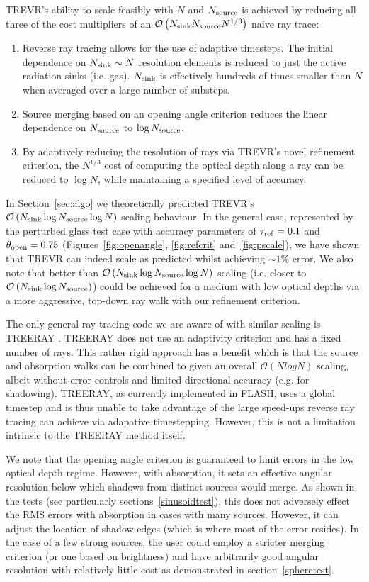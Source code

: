 \documentclass[fleq,usenatbib]{mnras}
\newcommand{\acro}{TREVR}
\newcommand{\bigO}[1]{\mathcal{O}\left(#1\right)}
\newcommand{\NS}{N_{\rm source}}
\newcommand{\NK}{N_{\rm sink}}
\newcommand{\tr}{\tau_{\rm ref}}
\newcommand{\tO}{\theta_{\rm open}}
\begin{document}
{\acro{}'s ability to scale feasibly with $N$ and $\NS$ is achieved by reducing 
all three of the cost multipliers of an $\bigO{\NK \NS N^{1/3}}$ naive ray 
trace:
\begin{enumerate}
\item Reverse ray tracing allows for the use of adaptive timesteps. The 
initial dependence on $\NK \sim N$ resolution elements is reduced to just the 
active radiation sinks (i.e. gas). $\NK$ is effectively hundreds of times smaller than 
$N$ when averaged over a large number of substeps.  
\item Source merging based on an opening angle criterion reduces the linear 
dependence on $\NS$ to $\log\NS$.
\item By adaptively reducing the resolution of rays via \acro{}'s novel 
refinement criterion, the $N^{1/3}$ cost of computing the optical depth along a 
ray can be reduced to $\log N$, while maintaining a specified level of accuracy.  
\end{enumerate}

In Section~\ref{sec:algo} we theoretically predicted \acro{}'s 
$\bigO{\NK \log\NS \log N}$ scaling behaviour. In the general case, 
represented by the perturbed glass test case with accuracy parameters of 
$\tr=0.1$ and $\tO=0.75$ (Figures~\ref{fig:openangle}, \ref{fig:refcrit} 
and~\ref{fig:pscale}), we have shown that \acro{} can indeed scale as 
predicted whilst achieving $\sim 1\%$ error. We also note that better than 
$\bigO{\NK\log\NS\log N}$ scaling (i.e. closer to $\bigO{\NK \log\NS}$) could 
be achieved for a medium with low optical depths via a more aggressive, 
top-down ray walk with our refinement criterion. 

The only general ray-tracing code we are aware of with similar scaling is 
TREERAY \citep{Wunsch2018}. TREERAY does not use an adaptivity criterion and has 
a fixed number of rays. This rather rigid approach has a benefit which is that 
the source and absorption walks can be combined to given an overall 
$\bigO{N log N}$ scaling, albeit without error controls and limited 
directional accuracy (e.g. for shadowing). TREERAY, as currently implemented 
in FLASH, uses a global timestep and is thus unable to take advantage of the 
large speed-ups reverse ray tracing can achieve via adapative timestepping.
However, this is not a limitation intrinsic to the TREERAY method itself.   

We note that the opening angle criterion is guaranteed to limit
errors in the low optical depth regime.  However, with absorption, it
sets an effective angular resolution below which shadows from distinct
sources would merge.  As shown in the tests (see particularly
sections~\ref{sinusoidtest}), this does not adversely effect the RMS
errors with absorption in cases with many sources.  However, it can adjust the
location of shadow edges (which is where most of the error resides).  
In the case of a few strong sources, the
user could employ a stricter merging criterion (or one based on
brightness) and have arbitrarily good angular resolution with
relatively little cost as demonstrated in section~\ref{spheretest}.

}
\end{document}
